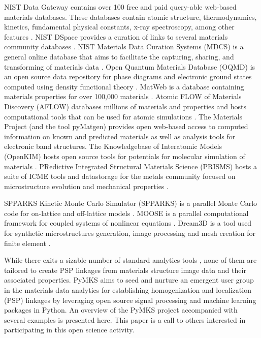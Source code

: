 \documentclass{bmcart}
\begin{document}
NIST Data Gateway contains over 100 free and paid query-able web-based materials databases. These databases contain atomic structure, thermodynamics, kinetics, fundamental physical constants, x-ray spectroscopy, among other features \cite{NISTgateway}. NIST DSpace provides a curation of links to several materials community databases \cite{nist2015dspace}. NIST Materials Data Curation Systems (MDCS) is a general online database that aims to facilitate the capturing, sharing, and transforming of materials data \cite{NISTDCS}. Open Quantum Materials Database (OQMD) is an open source data repository for phase diagrams and electronic ground states computed using density functional theory \cite{saal2013materials}. MatWeb is a database containing materials properties for over 100,000 materials \cite{matweb}.
Atomic FLOW of Materials Discovery (AFLOW) databases millions of materials and properties and hosts computational tools that can be used for atomic simulations \cite{curtarolo2012aflow}. The Materials Project (and the tool pyMatgen) \cite{ong2013python, jain2013commentary} provides open web-based access to computed information on known and predicted materials as well as analysis tools for electronic band structures. The Knowledgebase of Interatomic Models (OpenKIM) hosts open source tools for potentials for molecular simulation of materials \cite{kim2010project}. PRedictive Integrated Structural Materials Science (PRISMS) hosts a suite of ICME tools and datastorage for the metals community focused on microstructure evolution and mechanical properties \cite{prism}.

SPPARKS Kinetic Monte Carlo Simulator (SPPARKS) is a parallel Monte Carlo code for on-lattice and off-lattice models \cite{plimpton2012spparks}. MOOSE is a parallel computational framework for coupled systems of nonlinear equations \cite{gaston2009moose}. Dream3D is a tool used for synthetic microstructures generation, image processing and mesh creation for finite element \cite{groeber2014dream}.

While there exits a sizable number of standard analytics tools \cite{littell2006sas, seabold2010statsmodels, pedregosa2011scikit, albanese2012mlpy, goodfellow2013pylearn2, mckinney2012python, muller2014pystruct, demvsar2004orange, abadi2016tensorflow, van2014scikit}, none of them are tailored to create PSP linkages from materials structure image data and their associated properties. PyMKS aims to seed and nurture an emergent user group in the materials data analytics for establishing homogenization and localization (PSP) linkages by leveraging open source signal processing and machine learning packages in Python. An overview of the PyMKS project accompanied with several examples is presented here. This paper is a call to others interested in participating in this open science activity.
\end{document}
